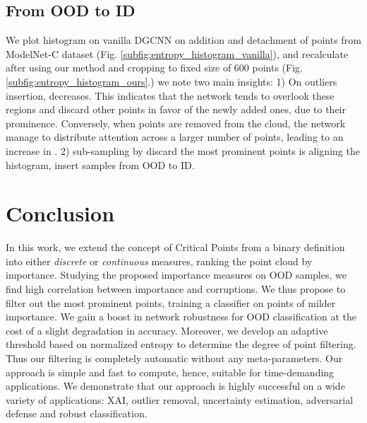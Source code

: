 \documentclass[10pt,twocolumn,letterpaper]{article}
\begin{document}
\subsection{From OOD to ID}
We plot  histogram on vanilla DGCNN\cite{dgcnn} on addition and detachment of points from ModelNet-C\cite{modelnet_c} dataset (Fig. \ref{subfig:entropy_histogram_vanilla}), and recalculate  after using our method and cropping to fixed size of 600 points (Fig. \ref{subfig:entropy_histogram_ours}.) we note two main insights: 1) On outliers insertion,  decreases. This indicates that the network tends to overlook these regions and discard other points in favor of the newly added ones, due to their prominence. Conversely, when points are removed from the cloud, the network manage to distribute attention across a larger number of points, leading to an increase in . 2) sub-sampling by discard the most prominent points is aligning the  histogram, insert samples from OOD to ID.






















\section{Conclusion}
In this work, we extend the concept of Critical Points \cite{pointnet} from a binary definition into either  \textit{discrete} or \textit{continuous} measures, ranking the point cloud by importance. 
Studying the proposed importance measures on OOD samples, we find high correlation between  importance and corruptions. We thus propose to filter out the most prominent points, training a classifier on points of milder importance. We gain a boost in network robustness for OOD classification at the cost of a slight degradation in accuracy. Moreover, we develop an adaptive threshold based on normalized entropy to determine the degree of point filtering. Thus our filtering is completely automatic without any meta-parameters.
Our approach is simple and fast to compute, hence, suitable for time-demanding applications. We demonstrate that our approach is highly successful on a wide variety of applications: XAI, outlier removal, uncertainty estimation, adversarial defense and robust classification.
{
    \small
    
    
}
\clearpage
\setcounter{page}{1}
\maketitlesupplementary
\end{document}
